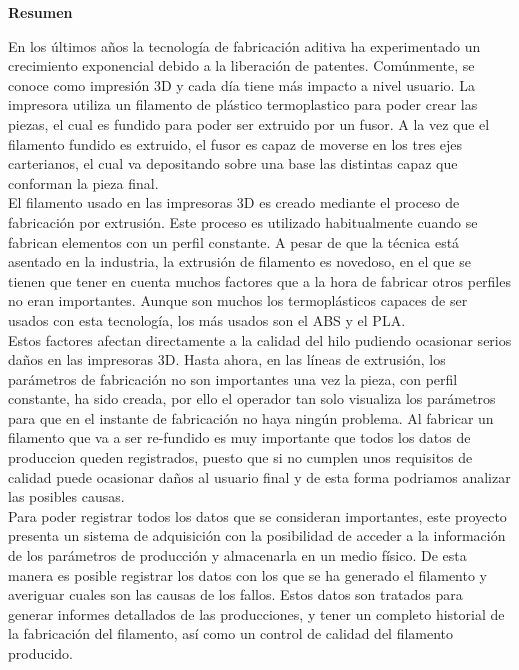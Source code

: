 
\thispagestyle{plain}
\begin{center}
    \Large
    \vspace{0.9cm}
    \textbf{Resumen}
\end{center}

En los últimos años la tecnología de fabricación aditiva ha experimentado un crecimiento exponencial debido a la liberación de patentes. Comúnmente, se conoce como impresión 3D y cada día tiene más impacto a nivel usuario. La impresora utiliza un filamento de plástico termoplastico para poder crear las piezas, el cual es fundido para poder ser extruido por un fusor. A la vez que el filamento fundido es extruido, el fusor es capaz de moverse en los tres ejes carterianos, el cual va depositando sobre una base las distintas capaz que conforman la pieza final.\\

El filamento usado en las impresoras 3D es creado mediante el proceso de fabricación por extrusión. Este proceso es utilizado habitualmente cuando se fabrican elementos con un perfil constante. A pesar de que la técnica está asentado en la industria, la extrusión de filamento es novedoso, en el que se tienen que tener en cuenta muchos factores que a la hora de fabricar otros perfiles no eran importantes. Aunque son muchos los termoplásticos capaces de ser usados con esta tecnología, los más usados son el ABS y el PLA.\\

Estos factores afectan directamente a la calidad del hilo pudiendo ocasionar serios daños en las impresoras 3D. Hasta ahora, en las líneas de extrusión, los parámetros de fabricación no son importantes una vez la pieza, con perfil constante, ha sido creada, por ello el operador tan solo visualiza los parámetros para que en el instante de fabricación no haya ningún problema. Al fabricar un filamento que va a ser re-fundido es muy importante que todos los datos de produccion queden registrados, puesto que si no cumplen unos requisitos de calidad puede ocasionar daños al usuario final y de esta forma podriamos analizar las posibles causas.\\

Para poder registrar todos los datos que se consideran importantes, este proyecto presenta un sistema de adquisición con la posibilidad de acceder a la información de los parámetros de producción y almacenarla en un medio físico. De esta manera es posible registrar los datos con los que se ha generado el filamento y averiguar cuales son las causas de los fallos. Estos datos son tratados para generar informes detallados de las producciones, y tener un completo historial de la fabricación del filamento, así como un control de calidad del filamento producido.\\

